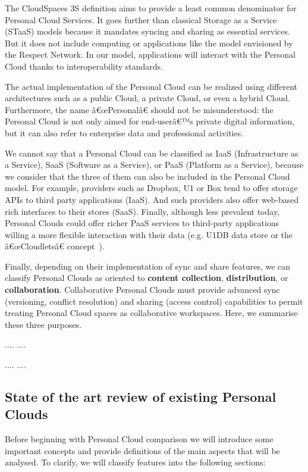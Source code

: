 {The CloudSpaces 3S definition aims to provide a least common denominator for Personal Cloud Services. It goes further than classical Storage as a Service (STaaS) models because it mandates syncing and sharing as essential services. But it does not include computing or applications like the model envisioned by the Respect Network. In our model, applications will interact with the Personal Cloud thanks to interoperability standards.


The actual implementation of the Personal Cloud can be realized using different architectures such as a public Cloud, a private Cloud, or even a hybrid Cloud. Furthermore, the name â€œPersonalâ€ should not be misunderstood: the Personal Cloud is not only aimed for end-userâ€™s private digital information, but it can also refer to enterprise data and professional activities.


We cannot say that a Personal Cloud can be classified as  IaaS (Infrastructure as a Service), SaaS (Software as a Service), or PaaS (Platform as a Service), because we consider that the three of them can also be included in the Personal Cloud model. For example, providers such as Dropbox, U1 or Box tend to offer storage APIs to third party applications (IaaS). And such providers also offer web-based rich interfaces to their stores (SaaS). Finally, although less prevalent today, Personal Clouds could offer richer PaaS services to third-party applications willing a more flexible interaction with their data (e.g. U1DB data store or the â€œCloudletsâ€ concept~\cite{openi}).


Finally, depending on their implementation of sync and share features, we can classify Personal Clouds as oriented to \textbf{content collection},  \textbf{distribution}, or  \textbf{collaboration}. Collaborative Personal Clouds must provide advanced sync (versioning, conflict resolution) and sharing (access  control) capabilities to permit treating Personal Cloud spaces as collaborative workspaces. Here, we summarise these three purposes.

....
....

....
....

\subsection{State of the art review of existing Personal Clouds}


Before beginning with Personal Cloud comparison we will introduce some important concepts and provide definitions of the main aspects that will be analysed. To clarify, we will classify features into the following sections:

}

